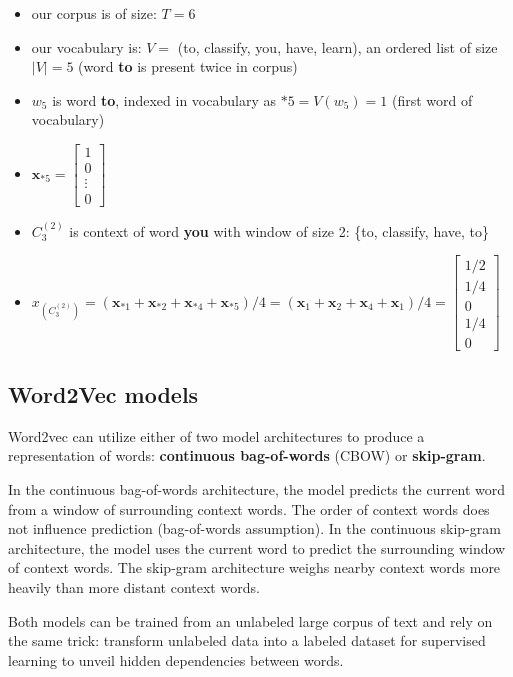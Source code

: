 \begin{itemize}
	\item our corpus is of size: $T=6$
	\item our vocabulary is: $V =$ (to, classify, you, have, learn), an ordered list of size $|V| = 5$ (word \textbf{to} is present twice in corpus)
	\item $w_5$ is word \textbf{to}, indexed in vocabulary as $*5 = V(w_5) = 1$ (first word of vocabulary)
	\item $\mathbf{x}_{*5} = \begin{bmatrix} 
		1 \\
		0 \\
		\vdots\\
		0
	\end{bmatrix}$
	\item $C_3^{(2)}$ is context of word \textbf{you} with window of size 2: \{to, classify, have, to\}
	\item $x_{(C_3^{(2)})} = 
	(\mathbf{x}_{*1} +\mathbf{x}_{*2} + \mathbf{x}_{*4} + \mathbf{x}_{*5}) / 4 = (\mathbf{x}_{1} +\mathbf{x}_{2} + \mathbf{x}_{4} + \mathbf{x}_{1}) / 4
	=\begin{bmatrix} 
		1/2 \\
		1/4 \\
		0\\
		1/4\\
		0
	\end{bmatrix}$
\end{itemize}


\subsection{Word2Vec models}

Word2vec can utilize either of two model architectures to produce a representation of words: \textbf{continuous bag-of-words} (CBOW) or \textbf{skip-gram}. 

In the continuous bag-of-words architecture, the model predicts the current word from a window of surrounding context words. The order of context words does not influence prediction (bag-of-words assumption). In the continuous skip-gram architecture, the model uses the current word to predict the surrounding window of context words. 
The skip-gram architecture weighs nearby context words more heavily than more distant context words.

Both models can be trained from an unlabeled large corpus of text and rely on the same trick: transform unlabeled data into a labeled dataset for supervised learning to unveil hidden dependencies between words.

